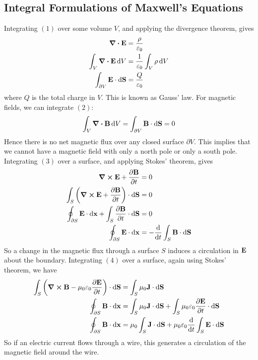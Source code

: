 \subsection{Integral Formulations of Maxwell's Equations}
Integrating \((1)\) over some volume \(V\), and applying the divergence theorem, gives
\begin{align*}
	\div{\vb E}                              & = \frac{\rho}{\varepsilon_0}                 \\
	\int_V \div{\vb E} \dd{V}                & = \frac{1}{\varepsilon_0} \int_V \rho \dd{V} \\
	\int_{\partial V} \vb E \cdot \dd{\vb S} & = \frac{Q}{\varepsilon_0}                    \\
\end{align*}
where \(Q\) is the total charge in \(V\).
This is known as Gauss' law.
For magnetic fields, we can integrate \((2)\):
\[
	\int_{V} \div{\vb B} \dd{V} = \int_{\partial V} \vb B \cdot \dd{\vb S} = 0
\]
Hence there is no net magnetic flux over any closed surface \(\partial V\).
This implies that we cannot have a magnetic field with only a north pole or only a south pole.
Integrating \((3)\) over a surface, and applying Stokes' theorem, gives
\begin{align*}
	\curl{\vb E} + \pdv{\vb B}{t}                                                      & = 0                                     \\
	\int_S \qty(\curl{\vb E} + \pdv{\vb B}{t}) \cdot \dd{\vb S}                        & = 0                                     \\
	\oint_{\partial S} \vb E \cdot \dd{\vb x} + \int_S \pdv{\vb B}{t} \cdot \dd{\vb S} & = 0                                     \\
	\oint_{\partial S} \vb E \cdot \dd{\vb x}                                          & = -\dv{t} \int_S \vb B \cdot \dd{\vb S}
\end{align*}
So a change in the magnetic flux through a surface \(S\) induces a circulation in \(\vb E\) about the boundary.
Integrating \((4)\) over a surface, again using Stokes' theorem, we have
\begin{align*}
	\int_S \qty(\curl{\vb B} - \mu_0\varepsilon_0 \pdv{\vb E}{t}) \cdot \dd{\vb S} & = \int_S \mu_0 \vb J \cdot \dd{\vb S}                                                             \\
	\oint_{\partial S} \vb B \cdot \dd{\vb x}                                      & = \int_S \mu_0 \vb J \cdot \dd{\vb S} + \int_S \mu_0\varepsilon_0 \pdv{\vb E}{t} \cdot \dd{\vb S} \\
	\oint_{\partial S} \vb B \cdot \dd{\vb x}                                      & = \mu_0 \int_S \vb J \cdot \dd{\vb S} + \mu_0\varepsilon_0 \dv{t} \int_S \vb E \cdot \dd{\vb S}   \\
\end{align*}
So if an electric current flows through a wire, this generates a circulation of the magnetic field around the wire.

